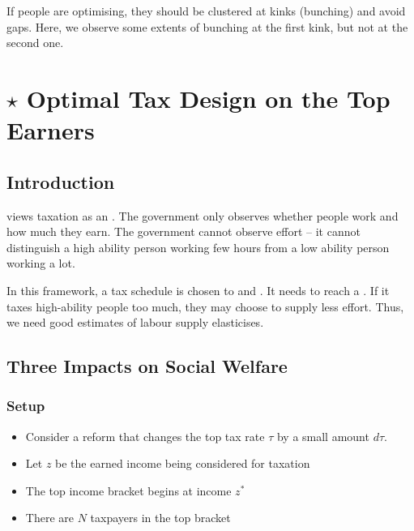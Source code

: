             If people are optimising, they should be clustered at kinks (bunching) and avoid gaps. Here, we observe some extents of bunching at the first kink, but not at the second one.
        

\section{$\star$ Optimal Tax Design on the Top Earners}\label{sec:optimal_top_tax}

    \subsection{Introduction}

        \cite{mirrlees_theory_1971} views taxation as an . The government only observes whether people work and how much they earn. The government cannot observe effort -- it cannot distinguish a high ability person working few hours from a low ability person working a lot.

        In this framework, a tax schedule is chosen to  and . It needs to reach a . If it taxes high-ability people too much, they may choose to supply less effort. Thus, we need good estimates of labour supply elasticises.

    \subsection{Three Impacts on Social Welfare}\label{sec:optimal_top_tax_impacts}

        \subsubsection{Setup}

        \begin{itemize}
            \item Consider a reform that changes the top tax rate $\tau$ by a small amount $d\tau$.
            \item Let $z$ be the earned income being considered for taxation
            \item The top income bracket begins at income $z^*$
            \item There are $N$ taxpayers in the top bracket
        \end{itemize}
        
